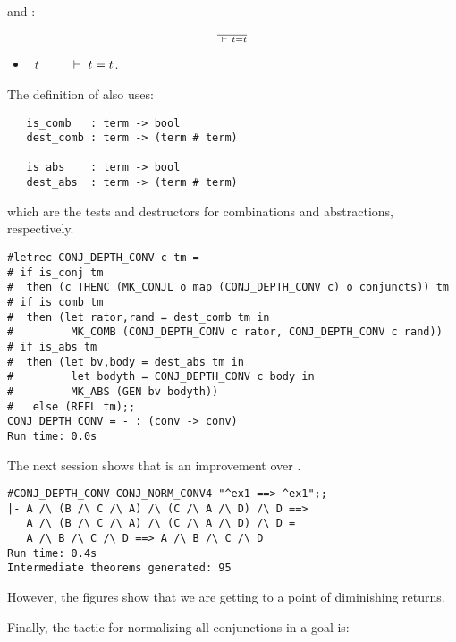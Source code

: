 \noindent and : 

$$ \over\ \vdash\  t = t$$

\begin{itemize}
\item{}~$t$~~\ml{=}~~ $\ \vdash\  t = t$.
\end{itemize}

\noindent The definition of  also uses:

\begin{hol}\begin{verbatim}
   is_comb   : term -> bool
   dest_comb : term -> (term # term)

   is_abs    : term -> bool
   dest_abs  : term -> (term # term)
\end{verbatim}\end{hol}

\noindent which are the tests and destructors for combinations and
abstractions, respectively.

\begin{session}\begin{verbatim}
#letrec CONJ_DEPTH_CONV c tm =
# if is_conj tm 
#  then (c THENC (MK_CONJL o map (CONJ_DEPTH_CONV c) o conjuncts)) tm
# if is_comb tm
#  then (let rator,rand = dest_comb tm in
#         MK_COMB (CONJ_DEPTH_CONV c rator, CONJ_DEPTH_CONV c rand))
# if is_abs tm 
#  then (let bv,body = dest_abs tm in
#         let bodyth = CONJ_DEPTH_CONV c body in
#         MK_ABS (GEN bv bodyth))
#   else (REFL tm);;
CONJ_DEPTH_CONV = - : (conv -> conv)
Run time: 0.0s
\end{verbatim}\end{session}

\noindent The next session shows that  is an
improvement over .

\begin{session}\begin{verbatim}
#CONJ_DEPTH_CONV CONJ_NORM_CONV4 "^ex1 ==> ^ex1";;
|- A /\ (B /\ C /\ A) /\ (C /\ A /\ D) /\ D ==>
   A /\ (B /\ C /\ A) /\ (C /\ A /\ D) /\ D =
   A /\ B /\ C /\ D ==> A /\ B /\ C /\ D
Run time: 0.4s
Intermediate theorems generated: 95
\end{verbatim}\end{session}

\noindent However, the figures show that we are getting to a point of
diminishing returns.

Finally, the tactic for normalizing all conjunctions in a goal is:

